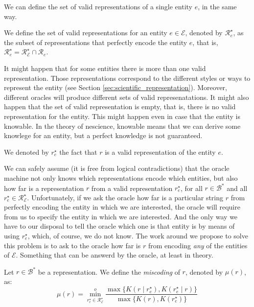 We can define the set of valid representations of a single entity $e$, in the same way.

\begin{definition}
We define the set of valid representations for an entity $e \in \mathcal{E}$, denoted by $\mathcal{R}^\star_e$, as the subset of representations that perfectly encode the entity $e$, that is, $\mathcal{R}^\star_e = \mathcal{R}^\star_\mathcal{E} \cap \mathcal{R}_e$.
\end{definition}

It might happen that for some entities there is more than one valid representation. Those representations correspond to the different styles or ways to represent the entity (see Section \ref{sec:scientific_representation}). Moreover, different oracles will produce different sets of valid represenatations. It might also happen that the set of valid representation is empty, that is, there is no valid representation for the entity. This might happen even in case that the entity is knowable. In the theory of nescience, knowable means that we can derive some knowlege for an entity, but a perfect knowledge is not guaranteed.

\begin{notation}
We denoted by $r^\star_e$ the fact that $r$ is a valid representation of the entity $e$.
\end{notation}

We can safely assume (it is free from logical contradictions) that the oracle machine not only knows which representations encode which entities, but also how far is a representation $r$ from a valid representation $r^\star_e$, for all $r \in \mathcal{B}^\ast$ and all $r^\star_e \in \mathcal{R}^\star_\mathcal{E}$. Unfortunately, if we ask the oracle how far is a particular string $r$ from perfectly encoding the entity in which we are interested, the oracle will require from us to specify the entity in which we are interested. And the only way we have to our disposal to tell the oracle which one is that entity is by means of using $r^\star_e$, which, of course, we do not know. The work around we propose to solve this problem is to ask to the oracle how far is $r$ from encoding \emph{any} of the entities of $\mathcal{E}$. Something that can be answerd by the oracle, at least in theory.

\begin{definition} [Miscoding]
\label{def:miscoding}
Let $r \in \mathcal{B}^\ast$ be a representation. We define the \emph{miscoding} of $r$, denoted by $\mu(r)$, as:
\[
\mu(r) = \overset{o}{ \underset{ r^\star_e \in \mathcal{R}^\star_\mathcal{E} } \min} \frac{ \max\{ K \left( r \mid r^\star_e \right), K \left( r^\star_e \mid r \right) \} } { \max\{ K \left( r \right), K \left( r^\star_e \right) \} }
\]
\end{definition}

